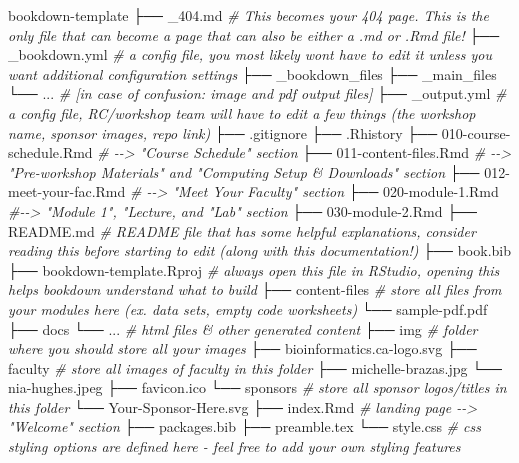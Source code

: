 \documentclass[
]{book}
\newenvironment{Shaded}{\begin{snugshade}}{\end{snugshade}}
\newcommand{\CommentTok}[1]{\textcolor[rgb]{0.56,0.35,0.01}{\textit{#1}}}
\newcommand{\ExtensionTok}[1]{#1}
\newcommand{\NormalTok}[1]{#1}
\theoremstyle{definition}
\theoremstyle{definition}
\theoremstyle{definition}
\theoremstyle{definition}
\theoremstyle{remark}
\begin{document}
\begin{Shaded}
\begin{Highlighting}[]
\ExtensionTok{bookdown{-}template}
\ExtensionTok{├──}\NormalTok{ \_404.md }\CommentTok{\# This becomes your 404 page. This is the only file that can become a page that can also be either a .md or .Rmd file!}
\ExtensionTok{├──}\NormalTok{ \_bookdown.yml }\CommentTok{\# a config file, you most likely won\textquotesingle{}t have to edit it unless you want additional configuration settings}
\ExtensionTok{├──}\NormalTok{ \_bookdown\_files}
\ExtensionTok{├──}\NormalTok{ \_main\_files}
    \ExtensionTok{└──}\NormalTok{ ... }\CommentTok{\# [in case of confusion: image and pdf output files]}
\ExtensionTok{├──}\NormalTok{ \_output.yml }\CommentTok{\# a config file, RC/workshop team will have to edit a few things (the workshop name, sponsor images, repo link)}
\ExtensionTok{├──}\NormalTok{ .gitignore}
\ExtensionTok{├──}\NormalTok{ .Rhistory}
\ExtensionTok{├──}\NormalTok{ 010{-}course{-}schedule.Rmd }\CommentTok{\# {-}{-}\textgreater{} "Course Schedule" section}
\ExtensionTok{├──}\NormalTok{ 011{-}content{-}files.Rmd }\CommentTok{\# {-}{-}\textgreater{} "Pre{-}workshop Materials" and "Computing Setup \& Downloads" section}
\ExtensionTok{├──}\NormalTok{ 012{-}meet{-}your{-}fac.Rmd }\CommentTok{\# {-}{-}\textgreater{} "Meet Your Faculty" section}
\ExtensionTok{├──}\NormalTok{ 020{-}module{-}1.Rmd }\CommentTok{\#{-}{-}\textgreater{} "Module 1", "Lecture, and "Lab" section}
\ExtensionTok{├──}\NormalTok{ 030{-}module{-}2.Rmd}
\ExtensionTok{├──}\NormalTok{ README.md }\CommentTok{\# README file that has some helpful explanations, consider reading this before starting to edit (along with this documentation!)}
\ExtensionTok{├──}\NormalTok{ book.bib}
\ExtensionTok{├──}\NormalTok{ bookdown{-}template.Rproj }\CommentTok{\# always open this file in RStudio, opening this helps bookdown understand what to build}
\ExtensionTok{├──}\NormalTok{ content{-}files }\CommentTok{\# store all files from your modules here (ex. data sets, empty code worksheets)}
    \ExtensionTok{└──}\NormalTok{ sample{-}pdf.pdf}
\ExtensionTok{├──}\NormalTok{ docs}
    \ExtensionTok{└──}\NormalTok{ ... }\CommentTok{\# html files \& other generated content}
\ExtensionTok{├──}\NormalTok{ img }\CommentTok{\# folder where you should store all your images}
    \ExtensionTok{├──}\NormalTok{ bioinformatics.ca{-}logo.svg }
    \ExtensionTok{├──}\NormalTok{ faculty }\CommentTok{\# store all images of faculty in this folder}
        \ExtensionTok{├──}\NormalTok{ michelle{-}brazas.jpg}
        \ExtensionTok{└──}\NormalTok{ nia{-}hughes.jpeg}
    \ExtensionTok{├──}\NormalTok{ favicon.ico}
    \ExtensionTok{└──}\NormalTok{ sponsors }\CommentTok{\# store all sponsor logos/titles in this folder}
         \ExtensionTok{└──}\NormalTok{ Your{-}Sponsor{-}Here.svg}
\ExtensionTok{├──}\NormalTok{ index.Rmd }\CommentTok{\# landing page {-}{-}\textgreater{} "Welcome" section}
\ExtensionTok{├──}\NormalTok{ packages.bib}
\ExtensionTok{├──}\NormalTok{ preamble.tex}
\ExtensionTok{└──}\NormalTok{ style.css }\CommentTok{\# css styling options are defined here {-} feel free to add your own styling features}
\end{Highlighting}
\end{Shaded}
\end{document}
